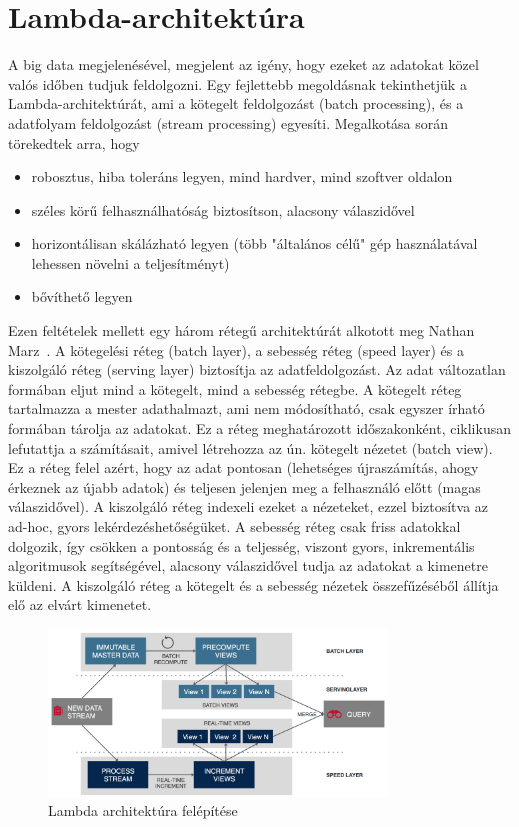 \documentclass[a4paper,12pt]{article}
\begin{document}
\section{Lambda-architektúra}
A big data megjelenésével, megjelent az igény, hogy ezeket az adatokat közel valós időben tudjuk feldolgozni. Egy fejlettebb megoldásnak tekinthetjük a Lambda-architektúrát, ami a kötegelt feldolgozást (batch processing), és a adatfolyam feldolgozást (stream processing) egyesíti. Megalkotása során törekedtek arra, hogy 
\begin{itemize}
\item robosztus, hiba toleráns legyen, mind hardver, mind szoftver oldalon
\item széles körű felhasználhatóság biztosítson, alacsony válaszidővel
\item horizontálisan skálázható legyen (több "általános célű" gép használatával lehessen növelni a teljesítményt)
\item bővíthető legyen
\end{itemize}

Ezen feltételek mellett egy három rétegű architektúrát alkotott meg Nathan Marz~\cite{lambda}. A kötegelési réteg (batch layer), a sebesség réteg (speed layer) és a kiszolgáló réteg (serving layer) biztosítja az adatfeldolgozást. Az adat változatlan formában eljut mind a kötegelt, mind a sebesség rétegbe. A kötegelt réteg tartalmazza a mester adathalmazt, ami nem módosítható, csak egyszer írható formában tárolja az adatokat. Ez a réteg meghatározott időszakonként, ciklikusan lefutattja a számításait, amivel létrehozza az ún. kötegelt nézetet (batch view). Ez a réteg felel azért, hogy az adat pontosan (lehetséges újraszámítás, ahogy érkeznek az újabb adatok) és teljesen jelenjen meg a felhasználó előtt (magas válaszidővel).  A kiszolgáló réteg indexeli ezeket a nézeteket, ezzel biztosítva az ad-hoc, gyors lekérdezéshetőségüket. \linebreak
A sebesség réteg csak friss adatokkal dolgozik, így csökken a pontosság és a teljesség, viszont gyors, inkrementális algoritmusok segítségével, alacsony válaszidővel tudja az adatokat a kimenetre küldeni. A kiszolgáló réteg a kötegelt és a sebesség nézetek összefűzéséből állítja elő az elvárt kimenetet.

\begin{figure}[ht!]
\centering
\includegraphics[width=90mm]{img/lambda.png}
\caption{Lambda architektúra felépítése \label{lambda}}
\end{figure}
\end{document}

